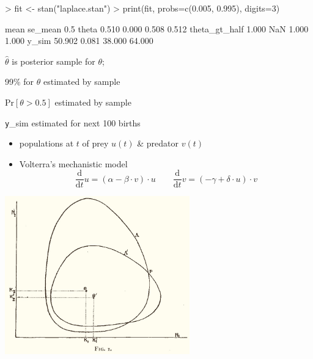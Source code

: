 \documentclass[10pt]{report}
\begin{document}
%
\begin{codein}
> fit <- stan("laplace.stan")
> print(fit, probs=c(0.005, 0.995), digits=3)
\end{codein}
\begin{codeout}
                     mean se_mean   0.5%
theta               0.510   0.000  0.508   0.512
theta_gt_half       1.000     NaN  1.000   1.000
y_sim              50.902   0.081 38.000  64.000
\end{codeout}
%
\begin{subitemize}
\item {} $\hat{\theta}$ is posterior sample  for $\theta$;
\item 99\%  for $\theta$ estimated by sample 
\item $\textrm{Pr}[\theta > 0.5]$ estimated by sample 
\item {\texttt y\_sim} estimated  for next 100 births
\end{subitemize}



\begin{itemize}
\item populations at $t$ of prey $u(t)$ \& predator $v(t)$
\item Volterra's mechanistic model
$$
\frac{\textrm{d}}{\textrm{d}t}u = (\alpha - \beta \cdot v) \cdot u
\qquad
\frac{\textrm{d}}{\textrm{d}t}v = (-\gamma + \delta \cdot u) \cdot v
$$
\vspace*{-12pt}
\end{itemize}

\begin{center}
\includegraphics[width=0.6\textwidth]{img/volterra-solutions.jpg}
\end{center}
\end{document}
